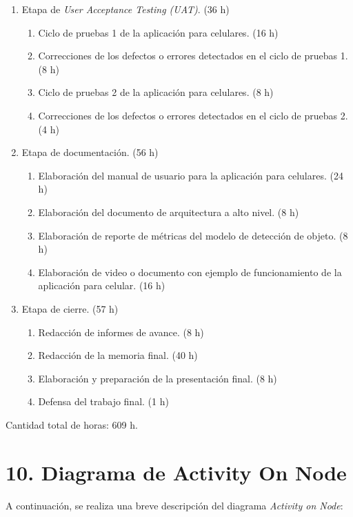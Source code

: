 \documentclass[
11pt, %
]{charter}
\begin{document}
\begin{enumerate}
\item Etapa de \textit{User Acceptance Testing (UAT)}. (36 h)
    \begin{enumerate}
        \item Ciclo de pruebas 1 de la aplicación para celulares. (16 h)
        \item Correcciones de los defectos o errores detectados en el ciclo de pruebas 1. (8 h)
        \item Ciclo de pruebas 2 de la aplicación para celulares. (8 h)
        \item Correcciones de los defectos o errores detectados en el ciclo de pruebas 2. (4 h)
    \end{enumerate}

\item  Etapa de documentación. (56 h)
    \begin{enumerate}
        \item Elaboración del manual de usuario para la aplicación para celulares. (24 h)
        \item Elaboración del documento de arquitectura a alto nivel. (8 h)
        \item Elaboración de reporte de métricas del modelo de detección de objeto. (8 h)
        \item Elaboración de video o documento con ejemplo de funcionamiento de la aplicación para celular. (16 h)
    \end{enumerate}

\item Etapa de cierre. (57 h)
    \begin{enumerate}
        \item Redacción de informes de avance. (8 h)
        \item Redacción de la memoria final. (40 h)
        \item Elaboración y preparación de la presentación final. (8 h)
        \item Defensa del trabajo final. (1 h)
    \end{enumerate}

\end{enumerate}

Cantidad total de horas: 609 h.


\section{10. Diagrama de Activity On Node}
\label{sec:AoN}
A continuación, se realiza una breve descripción del diagrama \textit{Activity on Node}:
\end{document}
